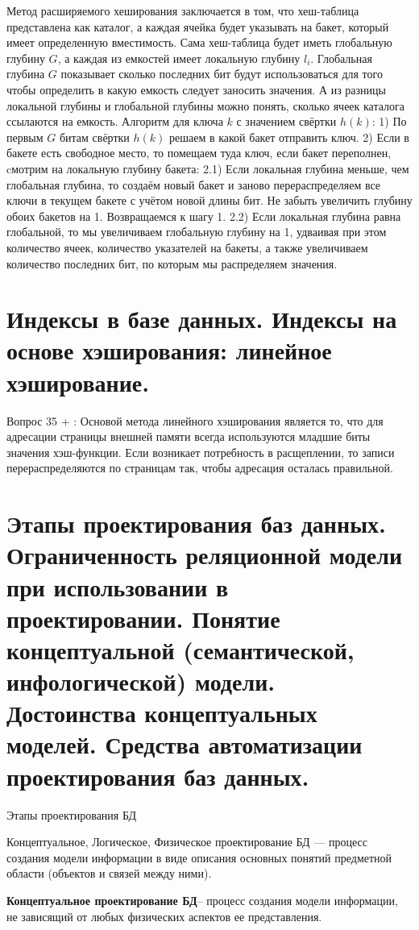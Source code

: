 \documentclass[a4paper,12pt]{article}
\begin{document}
Метод расширяемого хеширования заключается в том, что хеш-таблица представлена как
каталог, а каждая ячейка будет указывать на бакет, который имеет определенную
вместимость. Сама хеш-таблица будет иметь глобальную глубину $G$, а каждая из емкостей
имеет локальную глубину $l_i$. Глобальная глубина $G$ показывает сколько последних бит
будут использоваться для того чтобы определить в какую емкость следует заносить значения.
А из разницы локальной глубины и глобальной глубины можно понять, сколько ячеек каталога
ссылаются на емкость. Алгоритм для ключа $k$ с значением свёртки $h(k)$:
1) По первым $G$ битам свёртки $h(k)$ решаем в какой бакет отправить ключ.
2) Если в бакете есть свободное место, то помещаем туда ключ, если бакет переполнен,
cмотрим на локальную глубину бакета:
2.1) Если локальная глубина меньше, чем глобальная глубина, то создаём новый бакет
и заново перераспределяем все ключи в текущем бакете с учётом новой длины бит. Не забыть
увеличить глубину обоих бакетов на 1. Возвращаемся к шагу 1.
2.2) Если локальная глубина равна глобальной, то мы увеличиваем глобальную
глубину на 1, удваивая при этом количество ячеек, количество указателей на бакеты, а также
увеличиваем количество последних бит, по которым мы распределяем значения.

\section{Индексы в базе данных. Индексы на основе хэширования: линейное хэширование.}
Вопрос 35 + :
Основой метода линейного хэширования является то, что для адресации страницы внешней
памяти всегда используются младшие биты значения хэш-функции. Если возникает
потребность в расщеплении, то записи перераспределяются по страницам так, чтобы
адресация осталась правильной.

\section{Этапы проектирования баз данных. Ограниченность реляционной модели при использовании в проектировании. Понятие концептуальной (семантической, инфологической) модели. Достоинства концептуальных моделей. Средства автоматизации проектирования баз данных.}
Этапы проектирования БД

Концептуальное, Логическое, Физическое проектирование БД — процесс 
создания модели информации в виде описания 
основных понятий предметной области (объектов и 
связей между ними).

\textbf{Концептуальное проектирование БД}– процесс 
создания модели информации, не зависящий от любых 
физических аспектов ее представления.
\end{document}
